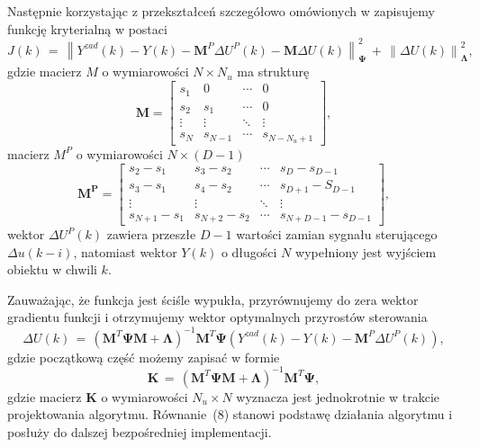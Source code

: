 \par Następnie korzystając z przekształceń szczegółowo omówionych w \cite{stp2009} zapisujemy funkcję kryterialną w postaci
\begin{equation}
J(k) \, = \, \left\| Y^{zad}(k) - Y(k) - \bm{M}^P \Delta U^P(k) - \bm{M} \Delta U(k) \right\|_{\bm{\Psi}}^2 \,+ \,
\left\| \Delta U(k) \right\|_{\bm{\Lambda}}^2 ,
\end{equation}
gdzie macierz \(M \) o wymiarowości \( N \times N_u \) ma strukturę
\begin{equation}
\bm{M} = 
	\begin{bmatrix}
		s_1 & 0 & \cdots & 0 \\
		s_2 & s_1 & \cdots & 0 \\
		\vdots & \vdots & \ddots & \vdots \\
		s_N & s_{N-1} & \cdots & s_{N-N_u+1}
	\end{bmatrix} ,
\end{equation} 
macierz \(M^P \) o wymiarowości \( N \times (D-1) \) 
\begin{equation}
\bm{M^P} = 
	\begin{bmatrix}
		s_2 - s_1 & s_3 - s_2 & \cdots & s_D - s_{D-1} \\
		s_3 - s_1 & s_4 - s_2 & \cdots & s_{D+1} - S_{D-1}  \\
		\vdots & \vdots & \ddots & \vdots \\
		s_{N+1} - s_1 & s_{N+2} - s_2 & \cdots & s_{N+D-1} - s_{D-1}
	\end{bmatrix} ,
\end{equation} 
wektor \( \Delta U^P(k) \) zawiera przeszłe \(D-1\) wartości zamian sygnału sterującego \(\Delta u(k-i)\), natomiast wektor \(Y(k)\) o długości $N$ wypełniony jest wyjściem obiektu w chwili $k$.

\par Zauważając, że funkcja jest ściśle wypukła, przyrównujemy do zera wektor gradientu funkcji i otrzymujemy wektor optymalnych przyrostów sterowania
\begin{equation}
\Delta U(k) \, = \, (\bm{M}^T\bm{\Psi}\bm{M}+\bm{\Lambda})^{-1}\bm{M}^T\bm{\Psi}(Y^{zad}(k) - Y(k) - \bm{M}^P \Delta U^P(k)) ,
\end{equation} 
gdzie początkową część możemy zapisać w formie 
\begin{equation}
\bm{K} \, = \, (\bm{M}^T\bm{\Psi}\bm{M}+\bm{\Lambda})^{-1}\bm{M}^T\bm{\Psi} ,
\end{equation}
gdzie macierz \( \bm{K}\) o wymiarowości \( N_u \times N \) wyznacza jest jednokrotnie w trakcie projektowania algorytmu. Równanie~(8) stanowi podstawę działania algorytmu i posłuży do dalszej bezpośredniej implementacji.

